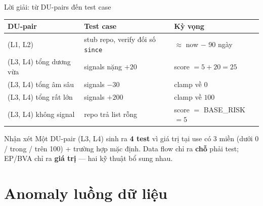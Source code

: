 \documentclass[aspectratio=169,12pt]{beamer}
\begin{document}
\begin{frame}{Lời giải: từ DU-pairs đến test case}
  \begin{center}
  \footnotesize
  \setlength{\tabcolsep}{4pt}
  \begin{tabular}{lll}
    \toprule
    \textbf{DU-pair} & \textbf{Test case} & \textbf{Kỳ vọng} \\
    \midrule
    (L1, L2) & stub repo, verify đối số \texttt{since} & $\approx$ now $-$ 90 ngày \\
    (L3, L4) tổng dương vừa & signals nặng $+20$ & score $= 5 + 20 = 25$ \\
    (L3, L4) tổng âm sâu    & signals $-30$ & clamp về $0$ \\
    (L3, L4) tổng rất lớn   & signals $+200$ & clamp về $100$ \\
    (L3, L4) không signal   & repo trả list rỗng & score $=$ BASE\_RISK $= 5$ \\
    \bottomrule
  \end{tabular}
  \end{center}

  \vspace{0.3em}
  \begin{exampleblock}{Nhận xét}
    Một DU-pair (L3, L4) sinh ra \textbf{4 test} vì giá trị tại use có
    3 miền (dưới 0 / trong / trên 100) + trường hợp mặc định.
    Data flow chỉ ra \textbf{chỗ} phải test; EP/BVA chỉ ra
    \textbf{giá trị} --- hai kỹ thuật bổ sung nhau.
  \end{exampleblock}
\end{frame}

\section{Anomaly luồng dữ liệu}
\end{document}
